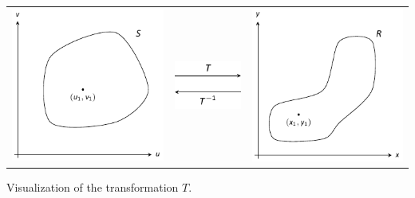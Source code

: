 \addtocounter{figure}{1}
\vskip 10pt
\hskip-50pt
\noindent\begin{minipage}[t]{\textwidth+100pt}
	\begin{tabular}{ccc}
		\includegraphics[align=c]{figures/fig13_jacobian_transformation_a} & \includegraphics[align=c]{figures/fig13_jacobian_transformation_c} & \includegraphics[align=c]{figures/fig13_jacobian_transformation_b}
	\end{tabular}
	\captionsetup{type=figure}%
	\caption{Visualization of the transformation $T$.}
	\label{fig:transformation}
\end{minipage}
\\
\vskip10pt
\addtocounter{figure}{-2}

